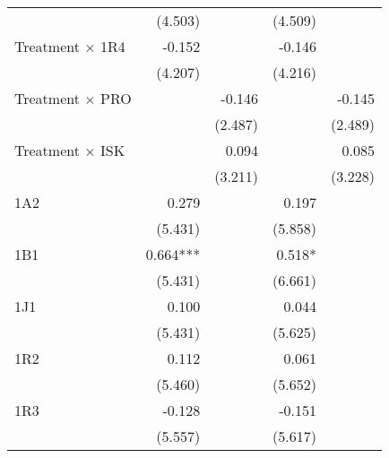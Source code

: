 \begin{table}[htbp]
\begin{tabular}{l*{4}{D{.}{.}{-1}}}
					&             (4.503)   &                       &             (4.509)   &                       \\
Treatment $\times$ 1R4&           -0.152      &                     &             -0.146  &                         \\
					&             (4.207)   &                       &             (4.216)   &                       \\
Treatment $\times$ PRO&                       &             -0.146  &                     &            -0.145       \\
					&                       &             (2.487)   &                       &             (2.489)   \\
Treatment $\times$ ISK&                       &              0.094  &                     &                0.085     \\
					&                       &             (3.211)   &                       &             (3.228)   \\
1A2                 &               0.279   &                       &               0.197   &                       \\
                    &             (5.431)   &                       &             (5.858)   &                       \\
1B1                  &               0.664***&                     &               0.518*  &                        \\
                    &             (5.431)   &                       &             (6.661)   &                       \\
1J1                 &               0.100   &                       &               0.044   &                       \\
                    &             (5.431)   &                       &             (5.625)   &                       \\
1R2                 &               0.112   &                       &               0.061   &                       \\
                    &             (5.460)   &                       &             (5.652)   &                       \\
1R3                 &              -0.128   &                       &              -0.151   &                       \\
                    &             (5.557)   &                       &             (5.617)   &                       \\

\end{tabular}
\end{table}

